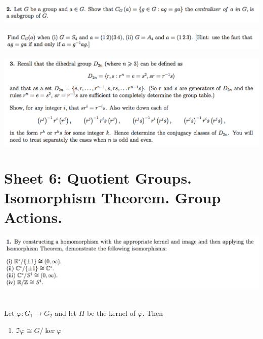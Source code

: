 \documentclass[12pt]{article}
\begin{document}
\begin{mdframed}
\includegraphics[width=400pt]{img/abstract-algebra-oxford-M1-5-2-1.png}
\end{mdframed}

\begin{mdframed}
\includegraphics[width=400pt]{img/abstract-algebra-oxford-M1-5-2-2.png}
\end{mdframed}

\begin{mdframed}
\includegraphics[width=400pt]{img/abstract-algebra-oxford-M1-5-3.png}
\end{mdframed}

\newpage
\section{Sheet 6: Quotient Groups. Isomorphism Theorem. Group Actions.}

\begin{mdframed}
\includegraphics[width=400pt]{img/abstract-algebra-oxford-M1-6-1.png}
\end{mdframed}

\begin{theorem*}~\\
  Let $\varphi:G_1 \to G_2$ and let $H$ be the kernel of $\varphi$. Then
  \begin{enumerate}
  \item $\Im \varphi \cong G/ \ker \varphi$
  \end{enumerate}
\end{theorem*}
\end{document}
